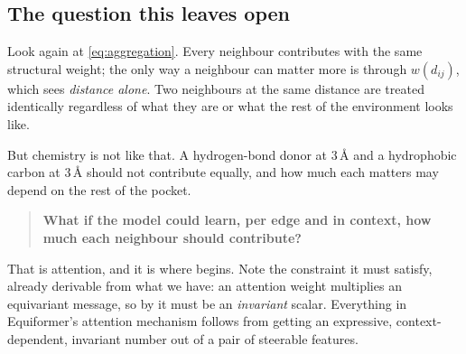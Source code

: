 \documentclass[11pt,a4paper]{report}
\theoremstyle{definition}
\theoremstyle{remark}
\begin{document}
\subsection{The question this leaves open}
\label{sec:towards-attention}

Look again at \eqref{eq:aggregation}. Every neighbour contributes with the
same structural weight; the only way a neighbour can matter more is through
$w(d_{ij})$, which sees \emph{distance alone}. Two neighbours at the same
distance are treated identically regardless of what they are or what the
rest of the environment looks like.

But chemistry is not like that. A hydrogen-bond donor at $3$\,\r A and a
hydrophobic carbon at $3$\,\r A should not contribute equally, and how much
each matters may depend on the rest of the pocket.

\begin{quote}
\textbf{What if the model could learn, per edge and in context, how much
each neighbour should contribute?}
\end{quote}

That is attention, and it is where  begins. Note the
constraint it must satisfy, already derivable from what we have: an
attention weight multiplies an equivariant message, so by
 it must be an \emph{invariant} scalar. Everything
in Equiformer's attention mechanism follows from getting an expressive,
context-dependent, invariant number out of a pair of steerable features.
\end{document}
